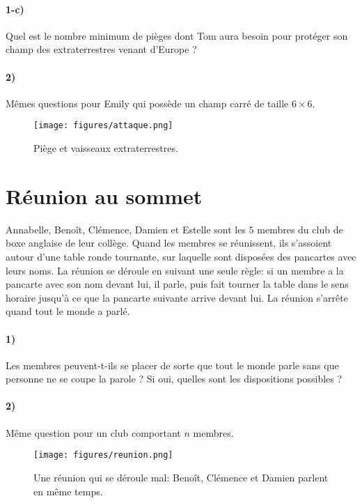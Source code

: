 \documentclass[a4paper,10pt,oneside]{article}
\begin{document}
\paragraph*{1-c)}
Quel est le nombre minimum de pièges dont Tom aura besoin pour protéger son champ des extraterrestres venant d'Europe ?

\paragraph*{2)}
Mêmes questions pour Emily qui possède un champ carré de taille $6\times 6$.


\vspace{3cm}
\begin{figure}[!ht]
  \centering
  \texttt{[image: figures/attaque.png]}
  \caption*{Piège et vaisseaux extraterrestres.}
\end{figure}


\clearpage
\section{Réunion au sommet}

Annabelle, Benoît, Clémence, Damien et Estelle sont les $5$ membres du club de boxe anglaise de leur collège.
Quand les membres se réunissent, ils s'assoient autour d'une table ronde tournante, sur laquelle sont disposées des pancartes avec leurs noms.
La réunion se déroule en suivant une seule règle: si un membre a la pancarte avec son nom devant lui, il parle, puis fait tourner la table dans le sens horaire jusqu'à ce que la pancarte suivante arrive devant lui.
La réunion s'arrête quand tout le monde a parlé.

\paragraph*{1)}
Les membres peuvent-t-ils se placer de sorte que tout le monde parle sans que personne ne se coupe la parole ?
Si oui, quelles sont les dispositions possibles ?

\paragraph*{2)}
Même question pour un club comportant $n$ membres.

\vspace{3cm}
\begin{figure}[!ht]
  \centering
  \texttt{[image: figures/reunion.png]}
  \caption*{Une réunion qui se déroule mal: Benoît, Clémence et Damien parlent en même temps. }
\end{figure}
\end{document}
